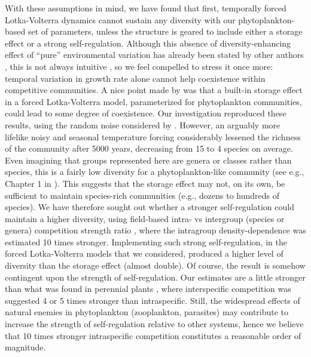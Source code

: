 \documentclass[a4paper,12pt]{article}
\begin{document}
With these assumptions in mind, we have found that first, temporally
forced Lotka-Volterra dynamics cannot sustain any diversity with our
phytoplankton-based set of parameters, unless the structure is geared
to include either a storage effect or a strong self-regulation. Although
this absence of diversity-enhancing effect of ``pure'' environmental
variation has already been stated by other authors \citep{chesson_roles_1997,barabas_community_2012,fox_intermediate_2013,scranton_coexistence_2016},
this is not always intuitive \citep{fox_intermediate_2013}, so we
feel compelled to stress it once more: temporal variation in growth
rate alone cannot help coexistence within competitive communities.
A nice point made by \citet{scranton_coexistence_2016} was that a
built-in storage effect in a forced Lotka-Volterra model, parameterized
for phytoplankton communities, could lead to some degree of coexistence.
Our investigation reproduced these results, using the random noise
considered by \citet{scranton_coexistence_2016}. However, an arguably
more lifelike noisy and seasonal temperature forcing considerably
lessened the richness of the community after 5000 years, decreasing
from 15 to 4 species on average. Even imagining that groups represented
here are genera or classes rather than species, this is a fairly low
diversity for a phytoplankton-like community (see e.g., Chapter 1
in \citealp{reynolds2006ecology}). This suggests that the storage
effect may not, on its own, be sufficient to maintain species-rich
communities (e.g., dozens to hundreds of species). We have therefore
sought out whether a stronger self-regulation could maintain a higher
diversity, using field-based intra- vs intergroup (species or genera)
competition strength ratio \citep{barraquand2018coastal}, where the
intragroup density-dependence was estimated 10 times stronger. Implementing
such strong self-regulation, in the forced Lotka-Volterra models that
we considered, produced a higher level of diversity than the storage
effect (almost double). Of course, the result is somehow contingent
upon the strength of self-regulation. Our estimates are a little stronger
than what was found in perennial plants \citep{adler_coexistence_2010},
where interspecific competition was suggested 4 or 5 times stronger
than intraspecific. Still, the widespread effects of natural enemies
in phytoplankton (zooplankton, parasites) may contribute to increase
the strength of self-regulation \citep{barraquand2018coastal,chesson_updates_2018}
relative to other systems, hence we believe that 10 times stronger
intraspecific competition constitutes a reasonable order of magnitude. 
\end{document}
